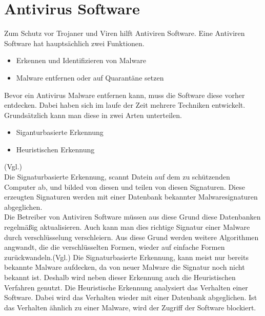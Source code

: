 \section{Antivirus Software}\label{sec:antivirus}
Zum Schutz vor Trojaner und Viren hilft Antiviren Software. Eine Antiviren Software hat hauptsächlich zwei Funktionen.
\begin{itemize}
    \item Erkennen und Identifizieren von Malware
    \item Malware entfernen oder auf Quarantäne setzen
\end{itemize}
Bevor ein Antivirus Malware entfernen kann, muss die Software diese vorher entdecken. Dabei haben sich im laufe der Zeit mehrere Techniken entwickelt. Grundsätzlich kann man diese in zwei Arten unterteilen.
\begin{itemize}
    \item Siganturbasierte Erkennung
    \item Heuristischen Erkennung
\end{itemize}
(Vgl.\cite{ANTNE1})\\
Die Signaturbasierte Erkennung, scannt Datein auf dem zu schützenden Computer ab, und bilded von diesen und teilen von diesen Signaturen. Diese erzeugten Signaturen werden mit einer Datenbank bekannter Malwaresignaturen abgeglichen.\\
Die Betreiber von Antiviren Software müssen aus diese Grund diese Datenbanken regelmäßig aktualisieren. Auch kann man dies richtige Signatur einer Malware durch verschlüsselung verschleiern. Aus diese Grund werden weitere Algorithmen angwandt, die die verschlüsselten Formen, wieder auf einfache Formen zurückwandeln.(Vgl.\cite{ANTNE2})
Die Signaturbasierte Erkennung, kann meist nur bereits bekannte Malware aufdecken, da von neuer Malware die Signatur noch nicht bekannt ist. Deshalb wird neben dieser Erkennung auch die Heuristischen Verfahren genutzt. 
Die Heuristische Erkennung analysiert das Verhalten einer Software. Dabei wird das Verhalten wieder mit einer Datenbank abgeglichen. Ist das Verhalten ähnlich zu einer Malware, wird der Zugriff der Software blockiert.\cite{ANTNE3}